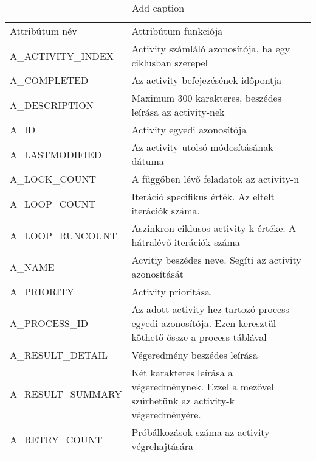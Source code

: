 \appendix
\chapter*{\fuggelek}
\setcounter{chapter}{\appendixnumber}

\appendix

\begin{table}[htbp]
	\centering
	\small
	\caption{Add caption}
	\begin{tabular}{p{.20\linewidth}p{.80\linewidth}}
		Attribútum név & Attribútum funkciója \\
		A\_ACTIVITY\_INDEX & Activity számláló azonosítója, ha egy ciklusban szerepel \\
		A\_COMPLETED & Az activity befejezésének időpontja \\
		A\_DESCRIPTION & Maximum 300 karakteres, beszédes leírása az activity-nek \\
		A\_ID & Activity egyedi azonosítója \\
		A\_LASTMODIFIED & Az activity utolsó módosításának dátuma \\
		A\_LOCK\_COUNT & A függőben lévő feladatok az activity-n \\
		A\_LOOP\_COUNT & Iteráció specifikus érték. Az eltelt iterációk száma. \\
		A\_LOOP\_RUNCOUNT & Aszinkron ciklusos activity-k értéke. A hátralévő iterációk száma \\
		A\_NAME & Acvitiy beszédes neve. Segíti az activity azonosítását \\
		A\_PRIORITY & Activity prioritása. \\
		A\_PROCESS\_ID & Az adott activity-hez tartozó process egyedi azonosítója. Ezen keresztül köthető össze a process táblával \\
		A\_RESULT\_DETAIL & Végeredmény beszédes leírása \\
		A\_RESULT\_SUMMARY & Két karakteres leírása a végeredménynek. Ezzel a mezővel szűrhetünk az activity-k végeredményére. \\
		A\_RETRY\_COUNT & Próbálkozások száma az activity végrehajtására \\

\end{tabular}
\end{table}
